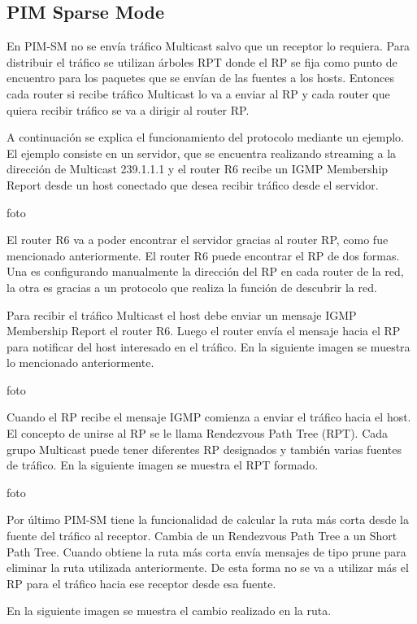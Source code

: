 \documentclass[12pt,a4paper,oneside]{book}
\begin{document}
\subsection{PIM Sparse Mode}

En PIM-SM no se envía tráfico Multicast salvo que un receptor lo requiera. Para distribuir el tráfico se utilizan árboles RPT donde el RP se fija como punto de encuentro para los paquetes que se envían de las fuentes a los hosts. Entonces cada router si recibe tráfico Multicast lo va a enviar al RP y cada router que quiera recibir tráfico se va a dirigir al router RP.

	A continuación se explica el funcionamiento del protocolo mediante un ejemplo. El ejemplo consiste en un servidor, que se encuentra realizando streaming a la dirección de Multicast 239.1.1.1 y el router R6 recibe un IGMP Membership Report desde un host conectado que desea recibir tráfico desde el servidor.

foto

El router R6 va a poder encontrar el servidor gracias al router RP, como fue mencionado anteriormente. El router R6 puede encontrar el RP de dos formas. Una es configurando manualmente la dirección del RP en cada router de la red, la otra es gracias a un protocolo que realiza la función de descubrir la red.  
	
Para recibir el tráfico Multicast el host debe enviar un mensaje IGMP Membership Report el router R6. Luego el router envía el mensaje hacia el RP para notificar del host interesado en el tráfico. En la siguiente imagen se muestra lo mencionado anteriormente.

foto

Cuando el RP recibe el mensaje IGMP comienza a enviar el tráfico hacia el host. El concepto de unirse al RP se le llama Rendezvous Path Tree (RPT). Cada grupo Multicast puede tener diferentes RP designados y también varias fuentes de tráfico. En la siguiente imagen se muestra el RPT formado.

foto

Por último PIM-SM tiene la funcionalidad de calcular la ruta más corta desde la fuente del tráfico al receptor. Cambia de un Rendezvous Path Tree a un Short Path Tree. Cuando obtiene la ruta más corta envía mensajes de tipo prune para eliminar la ruta utilizada anteriormente. De esta forma no se va a utilizar más el RP para el tráfico hacia ese receptor desde esa fuente.

En la siguiente imagen se muestra el cambio realizado en la ruta.
\end{document}

